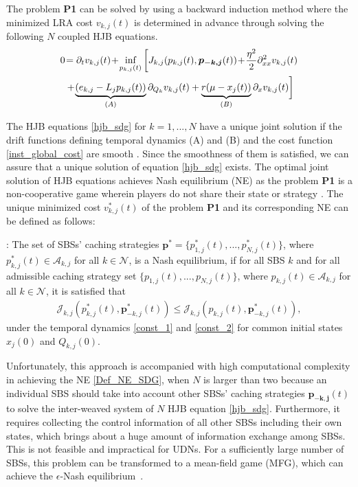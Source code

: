 \documentclass{book}
\begin{document}
    The problem \textbf{P1} can be solved by using a backward induction method where the minimized LRA cost $v_{k,j}(t)$ is determined in advance through solving the following  $N$ coupled HJB equations. 
    \begin{align}
    0&\!= \partial_t v_{k,j}(t)\! +\!\mathop{\text{inf}}\limits_{p_{k,j}(t)} \bigg{[}J_{k,j}(p_{k,j}(t),\boldsymbol{p_{-k,j}}(t))\!+\! \frac{\eta^2}{2}\partial_{xx}^2 v_{k,j}(t)\nonumber \\
     &+\! \underbrace{(e_{k,j} -L_j p_{k,j}(t))}_{(A)} \partial_{Q_k}v_{k,j}(t)+\underbrace{r(\mu-x_j(t))}_{(B)}\partial_x v_{k,j}(t)\bigg{]} \label{hjb_sdg}
    \end{align}
    
    {The HJB equations \eqref{hjb_sdg} for $ k=1,...,N$ have a unique joint solution if the drift functions defining temporal dynamics (A) and (B) and the cost function \eqref{inst_global_cost} are smooth \cite{exist_HJBsol1}. Since the smoothness of them is satisfied, we can assure that a unique solution of equation \eqref{hjb_sdg} exists. The optimal joint solution of HJB equations achieves Nash equilibrium (NE) as the problem \textbf{P1} is a non-cooperative game wherein players do not share their state or strategy  \cite{exist_HJBsol1,EV_JSAC}. 
    The unique minimized cost $v^*_{k,j}(t)$ of the problem \textbf{P1} and its corresponding NE can be defined as follows:
    }
    
    \vskip 10pt
    : The set of SBSs' caching strategies $\mathbf{p}^*=\{p_{1,j}^*(t),...,p_{N,j}^*(t) \}$, where $p_{k,j}^*(t) \in  \mathcal{A}_{k,j}$ for all $k \in \mathcal{N}$, is a Nash equilibrium, if for all SBS $k$ and for all admissible caching strategy set $\{p_{1,j}(t),...,p_{N,j}(t) \} $, where $p_{k,j}(t) \in  \mathcal{A}_{k,j}$ for all $k \in \mathcal{N}$, it is satisfied that 
    \begin{align}
    \mathcal{J}_{k,j}(p_{k,j}^*(t), \boldsymbol{p}_{-k,j}^*(t))\leq \mathcal{J}_{k,j}(p_{k,j}(t), \boldsymbol{p}_{-k,j}^*(t)), \label{Def_NE_SDG}
    \end{align}
    under the temporal dynamics \eqref{const_1} and \eqref{const_2} for common initial states $x_j(0)$ and $Q_{k,j}(0)$.
    
    \vskip 10pt
    
    {Unfortunately, this approach is accompanied with high computational complexity in achieving the NE \eqref{Def_NE_SDG}, when $N$ is larger than two because an individual SBS should take into account other SBSs' caching strategies $\boldsymbol{p_{-k,j}}(t)$ 
    to solve the inter-weaved system of $N$ HJB equation \eqref{hjb_sdg}.  Furthermore, it requires collecting the control information of all other SBSs including their own states, which brings about a huge amount of information exchange among SBSs. This is not feasible and impractical for UDNs. For a sufficiently large number of SBSs, this problem can be transformed  to a mean-field game (MFG), which can achieve the $\epsilon$-Nash equilibrium~\cite{MFG_application}.}
    
\end{document}
